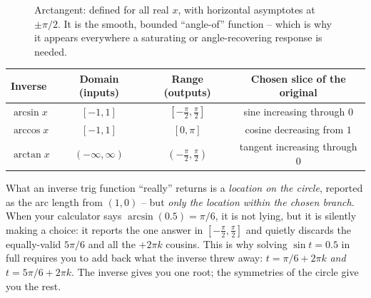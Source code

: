 \begin{figure}[H]
\centering
{}
\caption{Arctangent: defined for all real $x$, with horizontal asymptotes at $\pm\pi/2$. It is the smooth, bounded ``angle-of'' function -- which is why it appears everywhere a saturating or angle-recovering response is needed.}
\label{ch04:fig-arctan}
\end{figure}

\begin{center}
\begin{tabular}{lccc}
\toprule
Inverse & Domain (inputs) & Range (outputs) & Chosen slice of the original \\
\midrule
$\arcsin x$ & $[-1,1]$ & $[-\tfrac\pi2,\tfrac\pi2]$ & sine increasing through $0$ \\
$\arccos x$ & $[-1,1]$ & $[0,\pi]$ & cosine decreasing from $1$ \\
$\arctan x$ & $(-\infty,\infty)$ & $(-\tfrac\pi2,\tfrac\pi2)$ & tangent increasing through $0$ \\
\bottomrule
\end{tabular}
\end{center}

\begin{happeningbox}
What an inverse trig function ``really'' returns is a \emph{location on the circle}, reported as the arc length from $(1,0)$ -- but \emph{only the location within the chosen branch}. When your calculator says $\arcsin(0.5) = \pi/6$, it is not lying, but it is silently making a choice: it reports the one answer in $[-\tfrac\pi2,\tfrac\pi2]$ and quietly discards the equally-valid $5\pi/6$ and all the $+2\pi k$ cousins. This is why solving $\sin t = 0.5$ in full requires you to add back what the inverse threw away: $t = \pi/6 + 2\pi k$ \emph{and} $t = 5\pi/6 + 2\pi k$. The inverse gives you one root; the symmetries of the circle give you the rest.
\end{happeningbox}

